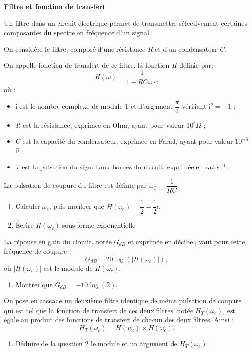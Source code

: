 \begin{center}
\textbf{Filtre et fonction de transfert}
\end{center}

Un filtre dans un circuit électrique permet de transmettre sélectivement certaines composantes du spectre en fréquence d'un signal.

On considère le filtre, composé d'une résistance $R$ et d'un condensateur $C$.

On appelle fonction de transfert de ce filtre, la fonction $H$ définie par: 
\[H(\omega) = \dfrac{1}{1 + RC \omega \cdot \text{i}}\]
où :
\begin{itemize}
\item i est le nombre complexe de module 1 et d'argument $\dfrac{\pi}{2}$ vérifiant i$^2 = -1$ ;
\item $R$ est la résistance, exprimée en Ohm, ayant pour valeur $10^6 \Omega$ ;
\item $C$ est la capacité du condensateur, exprimée en Farad, ayant pour valeur $10^{- 6}$ F ;
\item $\omega$ est la pulsation du signal aux bornes du circuit, exprimée en rad.s$^{- 1}$.
\end{itemize}

\medskip

La pulsation de coupure du filtre est définie par $\omega_{\text{C}} = \dfrac{1}{RC}$.

\begin{enumerate}
\item Calculer $\omega_{c}$, puis montrer que $H\left(\omega_{c}\right) = \dfrac12 - \dfrac12\text{i}$.
\item Écrire $H\left(\omega_{c}\right)$ sous forme exponentielle.
\end{enumerate}

La réponse en gain du circuit, notée $G_{dB}$ et exprimée en décibel, vaut pour cette fréquence de coupure :
\[G_{dB} = 20 \log \left(\left|H\left(\omega_{c}\right)\right|\right),\]
où $\left|H\left(\omega_{c}\right)\right|$ est le module de $H\left(\omega_{c}\right)$.

\begin{enumerate}[resume]
\item Montrer que $G_{dB} = -10 \log (2)$.
\end{enumerate}

On pose en cascade un deuxième filtre identique de même pulsation de coupure qui est tel que la fonction de transfert de ces deux filtres, notée $H_T\left(\omega_c\right)$, est égale au produit des fonctions de transfert de chacun des deux filtres. Ainsi :
\[H_T\left(\omega_c\right) = H\left(w_c\right) \times H\left(\omega_c\right).\]

\begin{enumerate}[resume]
\item Déduire de la question 2 le module et un argument de $H_T\left(\omega_c\right)$.
\end{enumerate}

\bigskip
